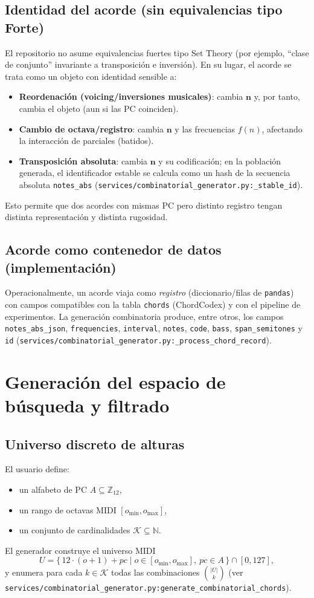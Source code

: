 \subsection{Identidad del acorde (sin equivalencias tipo Forte)}
El repositorio no asume equivalencias fuertes tipo Set Theory (por ejemplo, “clase de conjunto” invariante a transposición e inversión). En su lugar, el acorde se trata como un objeto con identidad sensible a:
\begin{itemize}
  \item \textbf{Reordenación (voicing/inversiones musicales)}: cambia $\mathbf{n}$ y, por tanto, cambia el objeto (aun si las PC coinciden).
  \item \textbf{Cambio de octava/registro}: cambia $\mathbf{n}$ y las frecuencias $f(n)$, afectando la interacción de parciales (batidos).
  \item \textbf{Transposición absoluta}: cambia $\mathbf{n}$ y su codificación; en la población generada, el identificador estable se calcula como un hash de la secuencia absoluta \texttt{notes\_abs} (\texttt{services/combinatorial\_generator.py:\_stable\_id}).
\end{itemize}
Esto permite que dos acordes con mismas PC pero distinto registro tengan distinta representación y distinta rugosidad.

\subsection{Acorde como contenedor de datos (implementación)}
Operacionalmente, un acorde viaja como \emph{registro} (diccionario/filas de \texttt{pandas}) con campos compatibles con la tabla \texttt{chords} (ChordCodex) y con el pipeline de experimentos. La generación combinatoria produce, entre otros, los campos \texttt{notes\_abs\_json}, \texttt{frequencies}, \texttt{interval}, \texttt{notes}, \texttt{code}, \texttt{bass}, \texttt{span\_semitones} y \texttt{id} (\texttt{services/combinatorial\_generator.py:\_process\_chord\_record}).

\section{Generación del espacio de búsqueda y filtrado}
\label{sec:generacion_espacio}

\subsection{Universo discreto de alturas}
El usuario define:
\begin{itemize}
  \item un alfabeto de PC $A\subseteq\mathbb{Z}_{12}$,
  \item un rango de octavas MIDI $[o_{\min},o_{\max}]$,
  \item un conjunto de cardinalidades $\mathcal{K}\subseteq\mathbb{N}$.
\end{itemize}
El generador construye el universo MIDI
\[
U=\{\,12\cdot(o+1)+pc\mid o\in[o_{\min},o_{\max}],\ pc\in A\,\}\cap[0,127],
\]
y enumera para cada $k\in\mathcal{K}$ todas las combinaciones $\binom{|U|}{k}$ (ver \texttt{services/combinatorial\_generator.py:generate\_combinatorial\_chords}).

